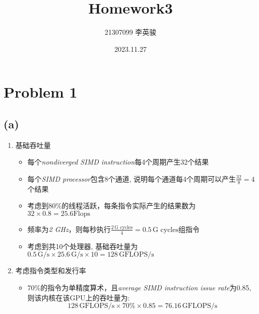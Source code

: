\documentclass{article}
\title{Homework3}
\author{21307099 李英骏}
\date{2023.11.27}
\begin{document}
\maketitle

\section*{Problem 1}
\subsection*{(a)}
\begin{enumerate}
    \item 基础吞吐量
          \begin{itemize}
              \item 每个\textit{nondiverged SIMD instruction}每4个周期产生32个结果
              \item 每个\textit{SIMD processor}包含8个通道, 说明每个通道每4个周期可以产生$\frac{32}{8} = 4$个结果
              \item 考虑到80\%的线程活跃，每条指令实际产生的结果数为$32 \times 0.8 = 25.6 \text{Flops}$
              \item 频率为\textit{2 GHz}，则每秒执行$\frac{2 \, \text{G cycles}}{4} = 0.5 \, \text{G cycles}$组指令
              \item 考虑到共10个处理器, 基础吞吐量为$0.5 \,\text{G/s} \times 25.6 \,\text{G/s} \times 10 = 128 \,\text{GFLOPS/s}$
          \end{itemize}

    \item 考虑指令类型和发行率
          \begin{itemize}
              \item 70\%的指令为单精度算术，且\textit{average SIMD instruction issue rate}为0.85, 则该内核在该GPU上的吞吐量为:
                    \[ 128 \,\text{GFLOPS/s} \times 70\% \times 0.85 = 76.16 \,\text{GFLOPS/s} \]
          \end{itemize}
\end{enumerate}
\end{document}
